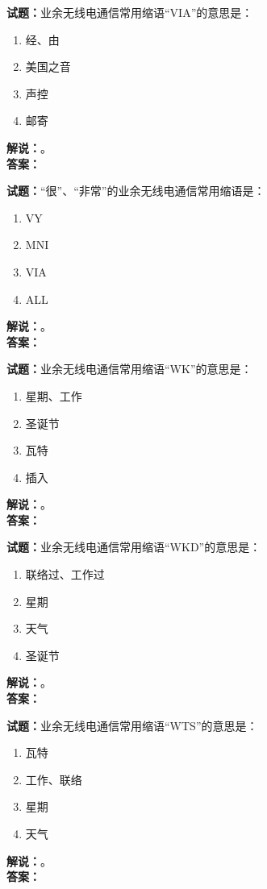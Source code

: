 \documentclass{ctexbook}
\begin{document}
\bigskip

\noindent\textbf{试题：}业余无线电通信常用缩语“VIA”的意思是：
\begin{enumerate}[leftmargin=3em]
  \item 经、由
  \item 美国之音%
  \item 声控
  \item 邮寄
\end{enumerate}
\noindent\textbf{解说：}\textbf{}。\\\noindent\textbf{答案：}

\bigskip

\noindent\textbf{试题：}“很”、“非常”的业余无线电通信常用缩语是：
\begin{enumerate}[leftmargin=3em]
  \item VY
  \item MNI
  \item VIA
  \item ALL
\end{enumerate}
\noindent\textbf{解说：}\textbf{}。\\\noindent\textbf{答案：}

\bigskip

\noindent\textbf{试题：}业余无线电通信常用缩语“WK”的意思是：
\begin{enumerate}[leftmargin=3em]
  \item 星期、工作
  \item 圣诞节
  \item 瓦特
  \item 插入
\end{enumerate}
\noindent\textbf{解说：}\textbf{}。\\\noindent\textbf{答案：}

\bigskip

\noindent\textbf{试题：}业余无线电通信常用缩语“WKD”的意思是：
\begin{enumerate}[leftmargin=3em]
  \item 联络过、工作过
  \item 星期
  \item 天气
  \item 圣诞节
\end{enumerate}
\noindent\textbf{解说：}\textbf{}。\\\noindent\textbf{答案：}

\bigskip

\noindent\textbf{试题：}业余无线电通信常用缩语“WTS”的意思是：
\begin{enumerate}[leftmargin=3em]
  \item 瓦特
  \item 工作、联络
  \item 星期
  \item 天气
\end{enumerate}
\noindent\textbf{解说：}\textbf{}。\\\noindent\textbf{答案：}
\end{document}
